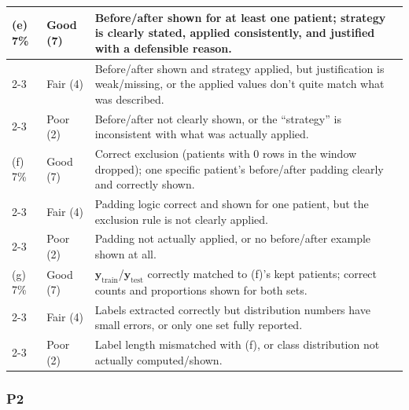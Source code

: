 \documentclass{article}
\newcommand{\bfy}{\mathbf{y}}
\begin{document}
\begin{center}
\begin{tabular}{|p{3cm}|p{1.8cm}|p{9.3cm}|}
\hline\hline
(e) 7\% & Good (7) & Before/after shown for at least one patient; strategy is clearly stated, applied consistently, and justified with a defensible reason. \\
\cline{2-3}
 & Fair (4) & Before/after shown and strategy applied, but justification is weak/missing, or the applied values don't quite match what was described. \\
\cline{2-3}
 & Poor (2) & Before/after not clearly shown, or the ``strategy'' is inconsistent with what was actually applied. \\
\hline\hline
(f) 7\% & Good (7) & Correct exclusion (patients with 0 rows in the window dropped); one specific patient's before/after padding clearly and correctly shown. \\
\cline{2-3}
 & Fair (4) & Padding logic correct and shown for one patient, but the exclusion rule is not clearly applied. \\
\cline{2-3}
 & Poor (2) & Padding not actually applied, or no before/after example shown at all. \\
\hline\hline
(g) 7\% & Good (7) & $\bfy_{\text{train}}$/$\bfy_{\text{test}}$ correctly matched to (f)'s kept patients; correct counts and proportions shown for both sets. \\
\cline{2-3}
 & Fair (4) & Labels extracted correctly but distribution numbers have small errors, or only one set fully reported. \\
\cline{2-3}
 & Poor (2) & Label length mismatched with (f), or class distribution not actually computed/shown. \\
\hline\hline
\end{tabular}
\end{center}

\subsubsection*{P2}
\end{document}
